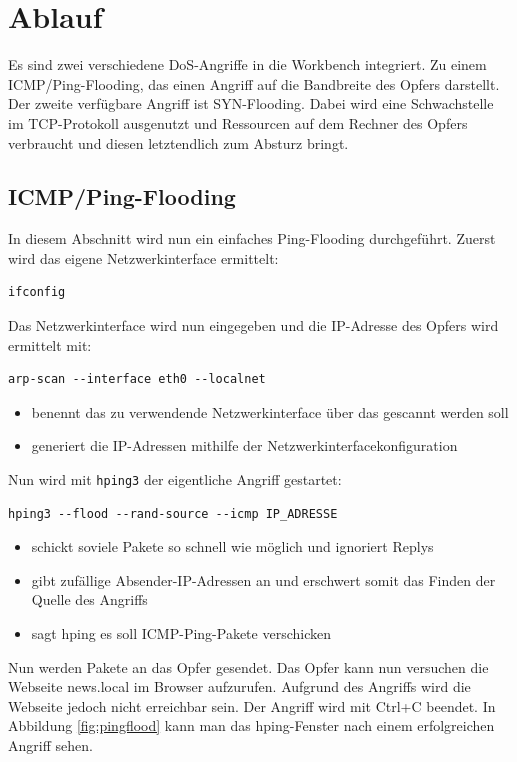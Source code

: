 \section{Ablauf}
Es sind zwei verschiedene DoS-Angriffe in die Workbench integriert. Zu einem ICMP/Ping-Flooding, das einen Angriff auf die Bandbreite des Opfers darstellt. Der zweite verfügbare Angriff ist SYN-Flooding. Dabei wird eine Schwachstelle im TCP-Protokoll ausgenutzt und Ressourcen auf dem Rechner des Opfers verbraucht und diesen letztendlich zum Absturz bringt.

\subsection{ICMP/Ping-Flooding}

In diesem Abschnitt wird nun ein einfaches Ping-Flooding durchgeführt. Zuerst wird das eigene Netzwerkinterface ermittelt:
\begin{lstlisting}
ifconfig
\end{lstlisting}
Das Netzwerkinterface wird nun eingegeben und die IP-Adresse des Opfers wird ermittelt mit:
\begin{lstlisting}
arp-scan --interface eth0 --localnet
\end{lstlisting}
\begin{itemize}
	\item {} benennt das zu verwendende Netzwerkinterface über das gescannt werden soll
	\item {} generiert die IP-Adressen mithilfe der Netzwerkinterfacekonfiguration
\end{itemize}

Nun wird mit \colorbox{altgray}{\lstinline|hping3|} der eigentliche Angriff gestartet:
\begin{lstlisting}
hping3 --flood --rand-source --icmp IP_ADRESSE
\end{lstlisting}
\begin{itemize}
	\item {} schickt soviele Pakete so schnell wie möglich und ignoriert Replys
	\item {} gibt zufällige Absender-IP-Adressen an und erschwert somit das Finden der Quelle des Angriffs
	\item {} sagt hping es soll ICMP-Ping-Pakete verschicken
\end{itemize}
Nun werden Pakete an das Opfer gesendet.
Das Opfer kann nun versuchen die Webseite news.local im Browser aufzurufen.
Aufgrund des Angriffs wird die Webseite jedoch nicht erreichbar sein.
Der Angriff wird mit Ctrl+C beendet. In Abbildung \ref{fig:pingflood} kann man das hping-Fenster nach einem erfolgreichen Angriff sehen.

